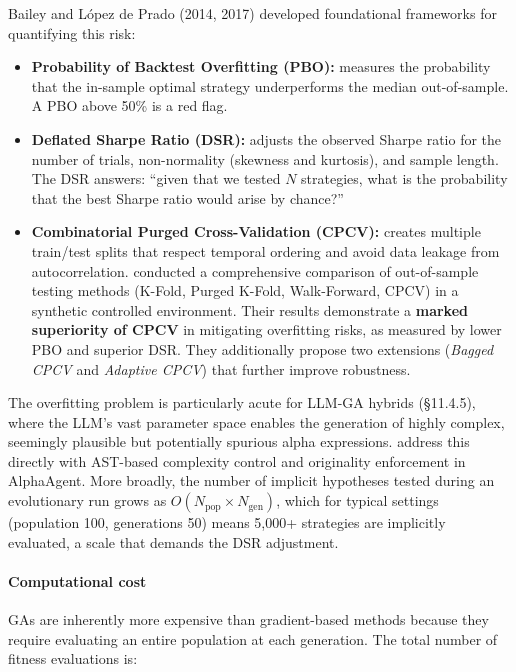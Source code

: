Bailey and López de Prado (2014, 2017) developed foundational frameworks for quantifying this risk:

\begin{itemize}
\item \textbf{Probability of Backtest Overfitting (PBO):} measures the probability that the in-sample optimal strategy underperforms the median out-of-sample. A PBO above 50\% is a red flag.
\item \textbf{Deflated Sharpe Ratio (DSR):} adjusts the observed Sharpe ratio for the number of trials, non-normality (skewness and kurtosis), and sample length. The DSR answers: ``given that we tested $N$ strategies, what is the probability that the best Sharpe ratio would arise by chance?''
\item \textbf{Combinatorial Purged Cross-Validation (CPCV):} creates multiple train/test splits that respect temporal ordering and avoid data leakage from autocorrelation. \cite{Arian2024} conducted a comprehensive comparison of out-of-sample testing methods (K-Fold, Purged K-Fold, Walk-Forward, CPCV) in a synthetic controlled environment. Their results demonstrate a \textbf{marked superiority of CPCV} in mitigating overfitting risks, as measured by lower PBO and superior DSR. They additionally propose two extensions (\textit{Bagged CPCV} and \textit{Adaptive CPCV}) that further improve robustness.
\end{itemize}

The overfitting problem is particularly acute for LLM-GA hybrids (§11.4.5), where the LLM's vast parameter space enables the generation of highly complex, seemingly plausible but potentially spurious alpha expressions. \cite{tang2025alphaagent} address this directly with AST-based complexity control and originality enforcement in AlphaAgent. More broadly, the number of implicit hypotheses tested during an evolutionary run grows as $O(N_{\text{pop}} \times N_{\text{gen}})$, which for typical settings (population 100, generations 50) means 5,000+ strategies are implicitly evaluated, a scale that demands the DSR adjustment.

\paragraph{Computational cost}

GAs are inherently more expensive than gradient-based methods because they require evaluating an entire population at each generation. The total number of fitness evaluations is:

